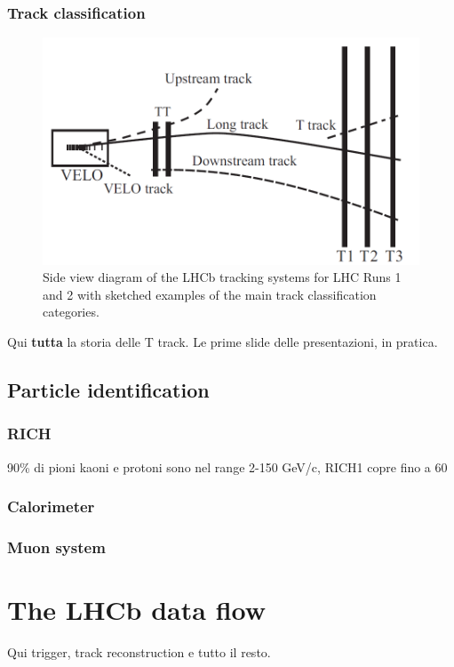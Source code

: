 \subsubsection{Track classification}

\begin{figure}[t]
	\centering
	\includegraphics[width=.8\textwidth]{graphics/02-lhcb/Track_Definitions.png}
	\caption[Side view diagram of LHCb tracking system and track categories.]{Side view diagram of the LHCb tracking systems for LHC Runs 1 and 2 with sketched examples of the main track classification categories.}
	\label{fig:2:track_classification}
\end{figure}

Qui \textbf{tutta} la storia delle T track. Le prime slide delle presentazioni, in pratica.

\subsection{Particle identification}
\label{sec:2:pid}

\subsubsection{RICH}

90\% di pioni kaoni e protoni sono nel range 2-150 GeV/c, RICH1 copre fino a 60

\subsubsection{Calorimeter}

\subsubsection{Muon system}

\section{The LHCb data flow}
\label{sec:2:data_flow}
Qui trigger, track reconstruction e tutto il resto.

